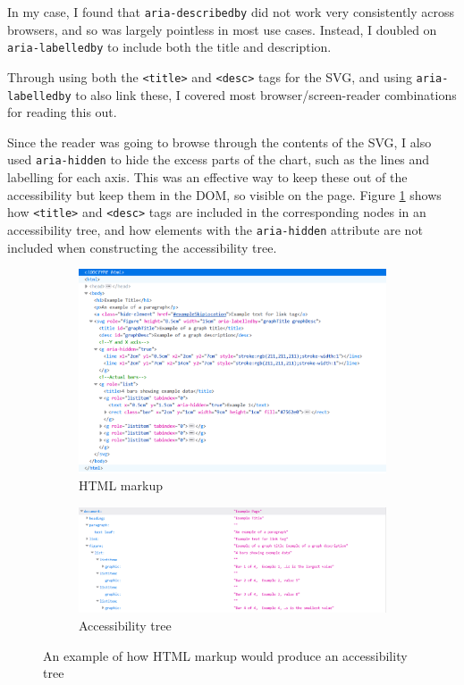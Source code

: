 \documentclass[ %
                    author={Aleena Baig},
                supervisor={Dr Simon Lock},
                    degree={BSc},
                     title={On Making Web Accessible Graphs},
                  subtitle={},
                      year={2019} ]{dissertation}
\begin{document}
In my case, I found that \texttt{aria-describedby} did not work very consistently across browsers, and so was largely pointless in most use cases. Instead, I doubled on \texttt{aria-labelledby} to include both the title and description.

Through using both the \texttt{<title>} and \texttt{<desc>} tags for the SVG, and using \texttt{aria-labelledby} to also link these, I covered most browser/screen-reader combinations for reading this out.

Since the reader was going to browse through the contents of the SVG, I also used \texttt{aria-hidden} to hide the excess parts of the chart, such as the lines and labelling for each axis. This was an effective way to keep these out of the accessibility but keep them in the DOM, so visible on the page. Figure \ref{fig:HTMLATComparison} shows how \texttt{<title>} and \texttt{<desc>} tags are included in the corresponding nodes in an accessibility tree, and how elements with the \texttt{aria-hidden} attribute are not included when constructing the accessibility tree.

\begin{figure}[h]
  \centering
  \begin{subfigure}[b]{0.8\textwidth}
    \centering
    \includegraphics[width=\linewidth]{images/ExampleHTML.PNG}
     \caption{HTML markup}
  \end{subfigure}
  \begin{subfigure}[b]{0.8\textwidth}
    \centering
    \includegraphics[width=\linewidth]{images/ExampleAccessibilityTree.PNG}
    \caption{Accessibility tree}
  \end{subfigure}
  \caption{An example of how HTML markup would produce an accessibility tree}
  \label{fig:HTMLATComparison}
\end{figure}
\end{document}
